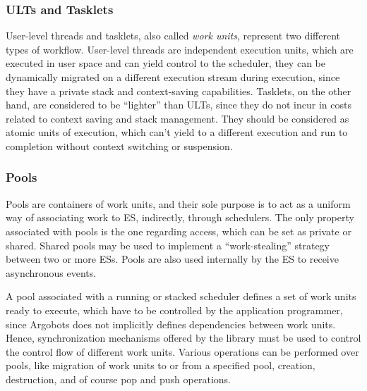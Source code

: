 \subsubsection{ULTs and Tasklets}
User-level threads and tasklets, also called \textit{work units}, represent two different types of workflow. User-level threads are independent execution units, which are executed in user space and can yield control to the scheduler, they can be dynamically migrated on a different execution stream during execution, since they have a private stack and context-saving capabilities. Tasklets, on the other hand, are considered to be ``lighter'' than ULTs, since they do not incur in costs related to context saving and stack management. They should be considered as atomic units of execution, which can't yield to a different execution and run to completion without context switching or suspension. 

\subsubsection{Pools}
Pools are containers of work units, and their sole purpose is to act as a uniform way of associating work to ES, indirectly, through schedulers. The only property associated with pools is the one regarding access, which can be set as private or shared. Shared pools may be used to implement a ``work-stealing'' strategy between two or more ESs. Pools are also used internally by the ES to receive asynchronous events.\newline

A pool associated with a running or stacked scheduler defines a set of work units ready to execute, which have to be controlled by the application programmer, since Argobots does not implicitly defines dependencies between work units. Hence, synchronization mechanisms offered by the library must be used to control the control flow of different work units.  Various operations can be performed over pools, like migration of work units to or from a specified pool, creation, destruction, and of course pop and push operations.

